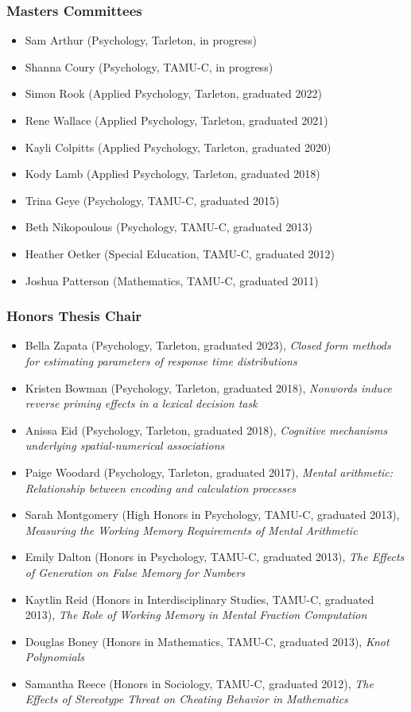\documentclass[article,10pt]{article}
\begin{document}
\subsubsection*{Masters Committees}
\label{sec:org619f2f7}
\begin{itemize}
\item Sam Arthur (Psychology, Tarleton, in progress)
\item Shanna Coury (Psychology, TAMU-C, in progress)
\item Simon Rook (Applied Psychology, Tarleton, graduated 2022)
\item Rene Wallace (Applied Psychology, Tarleton, graduated 2021)
\item Kayli Colpitts (Applied Psychology, Tarleton, graduated 2020)
\item Kody Lamb (Applied Psychology, Tarleton, graduated 2018)
\item Trina Geye (Psychology, TAMU-C, graduated 2015)
\item Beth Nikopoulous (Psychology, TAMU-C, graduated 2013)
\item Heather Oetker (Special Education, TAMU-C, graduated 2012)
\item Joshua Patterson (Mathematics, TAMU-C, graduated 2011)
\end{itemize}

\subsubsection*{Honors Thesis Chair}
\label{sec:orgd68e43b}
\begin{itemize}
\item Bella Zapata (Psychology, Tarleton, graduated 2023), \emph{Closed form methods for estimating parameters of response time distributions}
\item Kristen Bowman (Psychology, Tarleton, graduated 2018), \emph{Nonwords induce reverse priming effects in a lexical decision task}
\item Anissa Eid (Psychology, Tarleton, graduated 2018), \emph{Cognitive mechanisms underlying spatial-numerical associations}
\item Paige Woodard (Psychology, Tarleton, graduated 2017), \emph{Mental arithmetic: Relationship between encoding and calculation processes}
\item Sarah Montgomery (High Honors in Psychology, TAMU-C, graduated 2013), \emph{Measuring the Working Memory Requirements of Mental Arithmetic}
\item Emily Dalton (Honors in Psychology, TAMU-C, graduated 2013), \emph{The Effects of Generation on False Memory for Numbers}
\item Kaytlin Reid (Honors in Interdisciplinary Studies, TAMU-C, graduated 2013), \emph{The Role of Working Memory in Mental Fraction Computation}
\item Douglas Boney (Honors in Mathematics, TAMU-C, graduated 2013), \emph{Knot Polynomials}
\item Samantha Reece (Honors in Sociology, TAMU-C, graduated 2012), \emph{The Effects of Stereotype Threat on Cheating Behavior in Mathematics}
\end{itemize}
\end{document}
